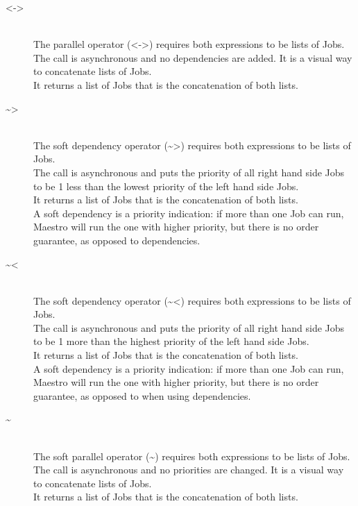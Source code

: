 \begin{description}
\item[<->] \hfil \\
The parallel operator (<->) requires both expressions to be lists of Jobs.\\
The call is asynchronous and no dependencies are added. It is a visual way to
concatenate lists of Jobs.\\
It returns a list of Jobs that is the concatenation of both lists.

\item[\textasciitilde>] \hfil \\
The soft dependency operator (\textasciitilde>) requires both expressions to be lists of Jobs.\\
The call is asynchronous and puts the priority of all right hand side Jobs to be 1 less than the lowest
priority of the left hand side Jobs.\\
It returns a list of Jobs that is the concatenation of both lists.\\
A soft dependency is a priority indication: if more than one Job can run, Maestro will run the
one with higher priority, but there is no order guarantee, as opposed to dependencies.

\item[\textasciitilde<] \hfil \\
The soft dependency operator (\textasciitilde<) requires both expressions to be lists of Jobs.\\
The call is asynchronous and puts the priority of all right hand side Jobs to be 1 more than the highest
priority of the left hand side Jobs.\\
It returns a list of Jobs that is the concatenation of both lists.\\
A soft dependency is a priority indication: if more than one Job can run, Maestro will run the
one with higher priority, but there is no order guarantee, as opposed to when using dependencies.

\item[\textasciitilde] \hfil \\
The soft parallel operator (\textasciitilde) requires both expressions to be lists of Jobs.\\
The call is asynchronous and no priorities are changed. It is a visual way to
concatenate lists of Jobs.\\
It returns a list of Jobs that is the concatenation of both lists.
\end{description}

